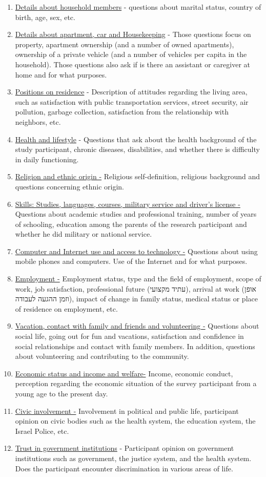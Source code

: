 \documentclass[
]{article}
\begin{document}
\begin{enumerate}
\def\labelenumi{\arabic{enumi}.}
\item
  \uline{Details about household members} - questions about marital
  status, country of birth, age, sex, etc.
\item
  \uline{Details about apartment, car and Housekeeping} - Those
  questions focus on property, apartment ownership (and a number of
  owned apartments), ownership of a private vehicle (and a number of
  vehicles per capita in the household). Those questions also ask if is
  there an assistant or caregiver at home and for what purposes.
\item
  \uline{Positions on residence} - Description of attitudes regarding
  the living area, such as satisfaction with public transportation
  services, street security, air pollution, garbage collection,
  satisfaction from the relationship with neighbors, etc.
\item
  \uline{Health and lifestyle} - Questions that ask about the health
  background of the study participant, chronic diseases, disabilities,
  and whether there is difficulty in daily functioning.
\item
  \uline{Religion and ethnic origin -} Religious self-definition,
  religious background and questions concerning ethnic origin.
\item
  \uline{Skills: Studies, languages, courses, military service and
  driver's license -} Questions about academic studies and professional
  training, number of years of schooling, education among the parents of
  the research participant and whether he did military or national
  service.
\item
  \uline{Computer and Internet use and access to technology -} Questions
  about using mobile phones and computers. Use of the Internet and for
  what purposes.
\item
  \uline{Employment -} Employment status, type and the field of
  employment, scope of work, job satisfaction, professional future (עתיד
  מקצועי), arrival at work (אופן וזמן ההגעה לעבודה), impact of change in
  family status, medical status or place of residence on employment,
  etc.
\item
  \uline{Vacation, contact with family and friends and volunteering -}
  Questions about social life, going out for fun and vacations,
  satisfaction and confidence in social relationships and contact with
  family members. In addition, questions about volunteering and
  contributing to the community.
\item
  \uline{Economic status and income and welfare-} Income, economic
  conduct, perception regarding the economic situation of the survey
  participant from a young age to the present day.
\item
  \uline{Civic involvement -} Involvement in political and public life,
  participant opinion on civic bodies such as the health system, the
  education system, the Israel Police, etc.
\item
  \uline{Trust in government institutions} - Participant opinion on
  government institutions such as government, the justice system, and
  the health system. Does the participant encounter discrimination in
  various areas of life.
\end{enumerate}
\end{document}
